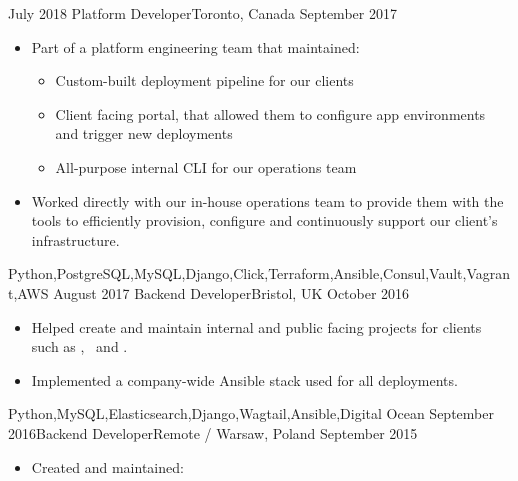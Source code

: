 \documentclass[localFont,alternative,10pt]{yaac-another-awesome-cv}
\begin{document}
\begin{experiences}
      {July 2018}     {Platform Developer}{}{Toronto, Canada}
      {September 2017}{
                        \begin{itemize}
                          \item Part of a platform engineering team that maintained:
                            \begin{itemize}
                              \item Custom-built deployment pipeline for our clients
                              \item Client facing portal, that allowed them to configure app environments and trigger new deployments
                              \item All-purpose internal CLI for our operations team
                            \end{itemize}
                          \item Worked directly with our in-house operations team to provide them with the tools to efficiently provision, configure and continuously support our client's infrastructure.
                        \end{itemize}
                      }
                      {Python,PostgreSQL,MySQL,Django,Click,Terraform,Ansible,Consul,Vault,Vagrant,AWS}
    \emptySeparator
    \experience
      {August 2017}   {Backend Developer}{}{Bristol, UK}
      {October 2016}  {
                        \begin{itemize}
                          \item Helped create and maintain internal and public facing projects for clients such as , ~and .
                          \item Implemented a company-wide Ansible stack used for all deployments.
                        \end{itemize}
                      }
                      {Python,MySQL,Elasticsearch,Django,Wagtail,Ansible,Digital Ocean}
    \emptySeparator
    \experience
      {September 2016}{Backend Developer}{}{Remote / Warsaw, Poland}
      {September 2015}{
                        \begin{itemize}
                          \item Created and maintained:
                            \begin{itemize}

\end{itemize}
\end{itemize}}
\end{experiences}
\end{document}
